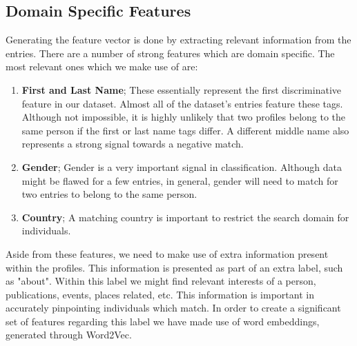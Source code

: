 \subsection{Domain Specific Features}
\label{sub-sec:domain-specific-features}
Generating the feature vector is done by extracting relevant information from
the entries. There are a number of strong features which are domain specific.
The most relevant ones which we make use of are:
\begin{enumerate}
  \item \textbf{First and Last Name}; These essentially represent the first discriminative
    feature in our dataset. Almost all of the dataset's entries feature these
    tags. Although not impossible, it is highly unlikely that two profiles
    belong to the same person if the first or last name tags differ. A different
    middle name also represents a strong signal towards a negative match.
  \item \textbf{Gender}; Gender is a very important signal in classification.
    Although data might be flawed for a few entries, in general, gender will
    need to match for two entries to belong to the same person.
  \item \textbf{Country}; A matching country is important to restrict the
    search domain for individuals.
\end{enumerate}

Aside from these features, we need to make use of extra information present
within the profiles. This information is presented as part of an extra label,
such as "about". Within this label we might find relevant interests of a person,
publications, events, places related, etc. This information is important in
accurately pinpointing individuals which match. In order to create a significant
set of features regarding this label we have made use of word embeddings, generated
through Word2Vec.


